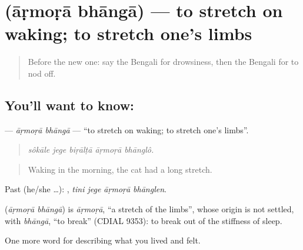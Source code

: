 \section[\texorpdfstring{\bn{আড়মোড়া} \bn{ভাঙা} (āṛmoṛā bhāngā)}{আড়মোড়া ভাঙা (āṛmoṛā bhāngā)}]{  (āṛmoṛā bhāngā) — to stretch on waking; to stretch one's limbs}

\label{lesson:BN-C479-armora-bhanga}



\begin{quote}
Before the new one: say the Bengali for drowsiness, then the Bengali for to nod off.
\end{quote}

\subsection*{You'll want to know:  }
\textbf{ } — \emph{āṛmoṛā bhāngā} — \textquotedblleft{}to stretch on waking; to stretch one's limbs\textquotedblright{}.

\begin{quote}
    
\end{quote}

\begin{quote}
\emph{sôkāle jege biṛālṭā āṛmoṛā bhānglô.}
\end{quote}

\begin{quote}
Waking in the morning, the cat had a long stretch.
\end{quote}

Past (he/she …):    , \emph{tini jege āṛmoṛā bhānglen}.

\begin{cousinweb}
\textbf{ } (\emph{āṛmoṛā bhāngā}) is \emph{āṛmoṛā}, \textquotedblleft{}a stretch of the limbs\textquotedblright{}, whose origin is not settled, with \emph{bhāngā}, \textquotedblleft{}to break\textquotedblright{} (CDIAL 9353): to break out of the stiffness of sleep.
\end{cousinweb}

\begin{grammarlens}[title={What you've built}]
One more word for describing what you lived and felt.
\end{grammarlens}

